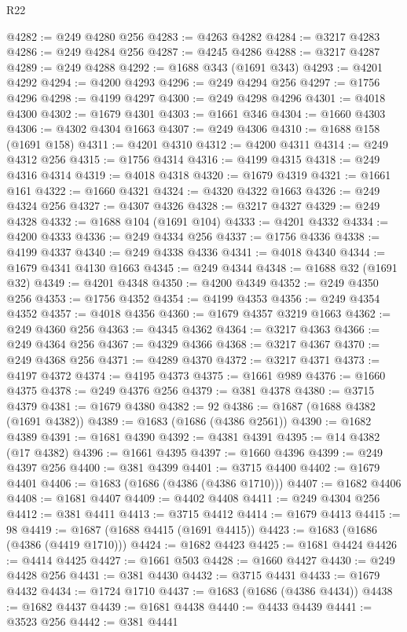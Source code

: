 \begin{lexlean}{R22}
\begin{coremodule}
@4282 := @249 @4280 @256
@4283 := @4263 @4282
@4284 := @3217 @4283
@4286 := @249 @4284 @256
@4287 := @4245 @4286
@4288 := @3217 @4287
@4289 := @249 @4288
@4292 := @1688 @343 (@1691 @343)
@4293 := @4201 @4292
@4294 := @4200 @4293
@4296 := @249 @4294 @256
@4297 := @1756 @4296
@4298 := @4199 @4297
@4300 := @249 @4298 @4296
@4301 := @4018 @4300
@4302 := @1679 @4301
@4303 := @1661 @346
@4304 := @1660 @4303
@4306 := @4302 @4304 @1663
@4307 := @249 @4306
@4310 := @1688 @158 (@1691 @158)
@4311 := @4201 @4310
@4312 := @4200 @4311
@4314 := @249 @4312 @256
@4315 := @1756 @4314
@4316 := @4199 @4315
@4318 := @249 @4316 @4314
@4319 := @4018 @4318
@4320 := @1679 @4319
@4321 := @1661 @161
@4322 := @1660 @4321
@4324 := @4320 @4322 @1663
@4326 := @249 @4324 @256
@4327 := @4307 @4326
@4328 := @3217 @4327
@4329 := @249 @4328
@4332 := @1688 @104 (@1691 @104)
@4333 := @4201 @4332
@4334 := @4200 @4333
@4336 := @249 @4334 @256
@4337 := @1756 @4336
@4338 := @4199 @4337
@4340 := @249 @4338 @4336
@4341 := @4018 @4340
@4344 := @1679 @4341 @4130 @1663
@4345 := @249 @4344
@4348 := @1688 @32 (@1691 @32)
@4349 := @4201 @4348
@4350 := @4200 @4349
@4352 := @249 @4350 @256
@4353 := @1756 @4352
@4354 := @4199 @4353
@4356 := @249 @4354 @4352
@4357 := @4018 @4356
@4360 := @1679 @4357 @3219 @1663
@4362 := @249 @4360 @256
@4363 := @4345 @4362
@4364 := @3217 @4363
@4366 := @249 @4364 @256
@4367 := @4329 @4366
@4368 := @3217 @4367
@4370 := @249 @4368 @256
@4371 := @4289 @4370
@4372 := @3217 @4371
@4373 := @4197 @4372
@4374 := @4195 @4373
@4375 := @1661 @989
@4376 := @1660 @4375
@4378 := @249 @4376 @256
@4379 := @381 @4378
@4380 := @3715 @4379
@4381 := @1679 @4380
@4382 := 92
@4386 := @1687 (@1688 @4382 (@1691 @4382))
@4389 := @1683 (@1686 (@4386 @2561))
@4390 := @1682 @4389
@4391 := @1681 @4390
@4392 := @4381 @4391
@4395 := @14 @4382 (@17 @4382)
@4396 := @1661 @4395
@4397 := @1660 @4396
@4399 := @249 @4397 @256
@4400 := @381 @4399
@4401 := @3715 @4400
@4402 := @1679 @4401
@4406 := @1683 (@1686 (@4386 (@4386 @1710)))
@4407 := @1682 @4406
@4408 := @1681 @4407
@4409 := @4402 @4408
@4411 := @249 @4304 @256
@4412 := @381 @4411
@4413 := @3715 @4412
@4414 := @1679 @4413
@4415 := 98
@4419 := @1687 (@1688 @4415 (@1691 @4415))
@4423 := @1683 (@1686 (@4386 (@4419 @1710)))
@4424 := @1682 @4423
@4425 := @1681 @4424
@4426 := @4414 @4425
@4427 := @1661 @503
@4428 := @1660 @4427
@4430 := @249 @4428 @256
@4431 := @381 @4430
@4432 := @3715 @4431
@4433 := @1679 @4432
@4434 := @1724 @1710
@4437 := @1683 (@1686 (@4386 @4434))
@4438 := @1682 @4437
@4439 := @1681 @4438
@4440 := @4433 @4439
@4441 := @3523 @256
@4442 := @381 @4441

\end{coremodule}
\end{lexlean}
